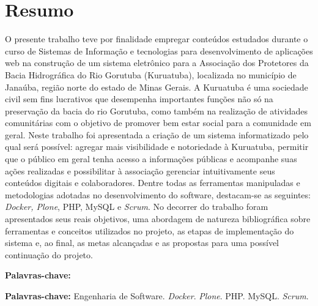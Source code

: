 \chapter*{Resumo}

\vspace{0.4cm}

\noindent O presente trabalho teve por finalidade empregar conteúdos estudados durante o curso de Sistemas de Informação e tecnologias para desenvolvimento de aplicações web na construção de um sistema eletrônico para a Associação dos Protetores da Bacia Hidrográfica do Rio Gorutuba (Kuruatuba), localizada no município de Janaúba, região norte do estado de Minas Gerais. 
A Kuruatuba é uma sociedade civil sem fins lucrativos que desempenha importantes funções não só na preservação da bacia do rio Gorutuba, como também na realização de atividades comunitárias com o objetivo de promover bem estar social para a comunidade em geral. 
Neste trabalho foi apresentada a criação de um sistema informatizado pelo qual será possível: agregar mais visibilidade e notoriedade à Kuruatuba, permitir que o público em geral tenha acesso a informações públicas e acompanhe suas ações realizadas e possibilitar à associação gerenciar intuitivamente seus conteúdos digitais e colaboradores.  
Dentre todas as ferramentas manipuladas e metodologias adotadas no desenvolvimento do software, destacam-se as seguintes: \textit{Docker, Plone}, PHP, MySQL e \textit{Scrum}.  
No decorrer do trabalho foram apresentados seus reais objetivos, uma abordagem de natureza bibliográfica sobre ferramentas e conceitos utilizados no projeto, as etapas de implementação do sistema e, ao final, as metas alcançadas e as propostas para uma possível continuação do projeto.

\begin{labeling}{\textbf{Palavras-chave:}}
\item[\textbf{Palavras-chave:}] 
Engenharia de Software.
\textit{Docker}.
\textit{Plone}.
PHP.
MySQL.
\textit{Scrum}.
\end{labeling}

